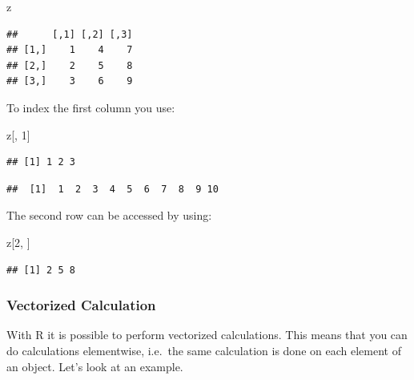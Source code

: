 \documentclass[]{book}
\newenvironment{Shaded}{\begin{snugshade}}{\end{snugshade}}
\newcommand{\DecValTok}[1]{\textcolor[rgb]{0.00,0.00,0.81}{#1}}
\newcommand{\OperatorTok}[1]{\textcolor[rgb]{0.81,0.36,0.00}{\textbf{#1}}}
\newcommand{\NormalTok}[1]{#1}
\theoremstyle{definition}
\theoremstyle{definition}
\theoremstyle{definition}
\theoremstyle{remark}
\begin{document}
\begin{Shaded}
\begin{Highlighting}[]
\NormalTok{z}
\end{Highlighting}
\end{Shaded}

\begin{verbatim}
##      [,1] [,2] [,3]
## [1,]    1    4    7
## [2,]    2    5    8
## [3,]    3    6    9
\end{verbatim}

To index the first column you use:

\begin{Shaded}
\begin{Highlighting}[]
\NormalTok{z[, }\DecValTok{1}\NormalTok{]}
\end{Highlighting}
\end{Shaded}

\begin{verbatim}
## [1] 1 2 3
\end{verbatim}

\begin{Shaded}
\end{Shaded}

\begin{verbatim}
##  [1]  1  2  3  4  5  6  7  8  9 10
\end{verbatim}

The second row can be accessed by using:

\begin{Shaded}
\begin{Highlighting}[]
\NormalTok{z[}\DecValTok{2}\NormalTok{, ]}
\end{Highlighting}
\end{Shaded}

\begin{verbatim}
## [1] 2 5 8
\end{verbatim}

\subsubsection{Vectorized Calculation}\label{vectorized-calculation}

With R it is possible to perform vectorized calculations. This means
that you can do calculations elementwise, i.e.~the same calculation is
done on each element of an object. Let's look at an example.
\end{document}
